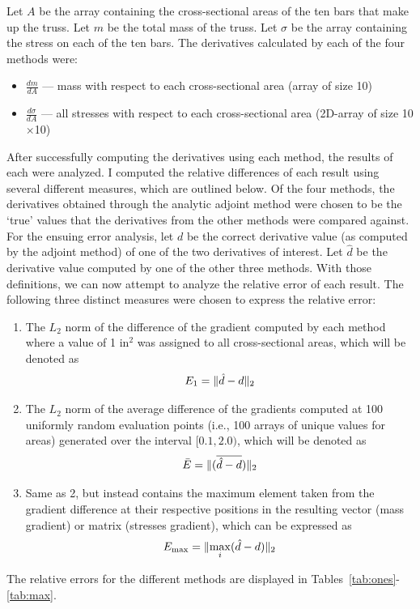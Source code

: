 \documentclass{article}
\DeclarePairedDelimiter{\norm}{\lVert}{\rVert}
\DeclareRobustCommand\widebar[1]{\mathop{\overline{#1}}}
\begin{document}
Let $A$ be the array containing the cross-sectional areas of the ten bars that make up the truss. Let $m$ be the total mass of the truss. Let $\sigma$ be the array containing the stress on each of the ten bars. The derivatives calculated by each of the four methods were:
\begin{itemize}
	\item $ \displaystyle \frac{dm}{dA} $ --- mass with respect to each cross-sectional area (array of size 10)
	\item $ \displaystyle \frac{d\sigma}{dA} $ --- all stresses with respect to each cross-sectional area (2D-array of size 10$\times$10)
\end{itemize}
After successfully computing the derivatives using each method, the results of each were analyzed. I computed the relative differences of each result using several different measures, which are outlined below. Of the four methods, the derivatives obtained through the analytic adjoint method were chosen to be the `true' values that the derivatives from the other methods were compared against. For the ensuing error analysis, let $d$ be the correct derivative value (as computed by the adjoint method) of one of the two derivatives of interest. Let $\hat{d}$ be the derivative value computed by one of the other three methods. With those definitions, we can now attempt to analyze the relative error of each result. The following three distinct measures were chosen to express the relative error: 
\begin{enumerate}
	\item The $L_2$ norm of the difference of the gradient computed by each method where a value of 1 in$^2$ was assigned to all cross-sectional areas, which will be denoted as 
	\begin{equation*}
		E_{1} = \norm{ \hat{d} - d }_2
	\end{equation*}
	\item The $L_2$ norm of the average difference of the gradients computed at 100 uniformly random evaluation points (i.e., 100 arrays of unique values for areas) generated over the interval $[0.1, 2.0)$, which will be denoted as
	\begin{equation*}
		\bar{E} = \norm{ ( \widebar{ \hat{d} - d } ) }_2
	\end{equation*}
	\item Same as 2, but instead contains the maximum element taken from the gradient difference at their respective positions in the resulting vector (mass gradient) or matrix (stresses gradient), which can be expressed as 
	\begin{equation*}
		E_{\max} = \norm{ \max_{i}( \hat{d} - d ) }_2
	\end{equation*}

\end{enumerate}
% 
The relative errors for the different methods are displayed in Tables~\ref{tab:ones}-\ref{tab:max}.
\end{document}
